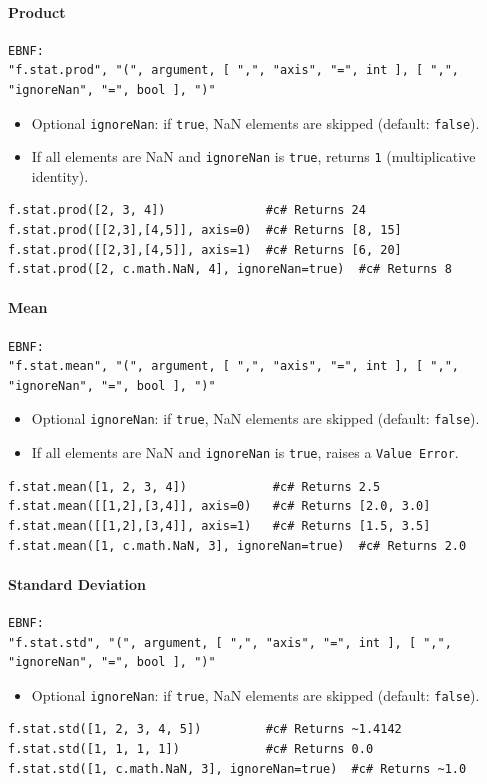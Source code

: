 \paragraph{Product}
\begin{verbatim}
EBNF:
"f.stat.prod", "(", argument, [ ",", "axis", "=", int ], [ ",", "ignoreNan", "=", bool ], ")"
\end{verbatim}
\begin{itemize}
\item Optional \texttt{ignoreNan}: if \texttt{true}, NaN elements are skipped (default: \texttt{false}).
\item If all elements are NaN and \texttt{ignoreNan} is \texttt{true}, returns \texttt{1} (multiplicative identity).
\end{itemize}
\begin{verbatim}
f.stat.prod([2, 3, 4])              #c# Returns 24
f.stat.prod([[2,3],[4,5]], axis=0)  #c# Returns [8, 15]
f.stat.prod([[2,3],[4,5]], axis=1)  #c# Returns [6, 20]
f.stat.prod([2, c.math.NaN, 4], ignoreNan=true)  #c# Returns 8
\end{verbatim}

\paragraph{Mean}
\begin{verbatim}
EBNF:
"f.stat.mean", "(", argument, [ ",", "axis", "=", int ], [ ",", "ignoreNan", "=", bool ], ")"
\end{verbatim}
\begin{itemize}
\item Optional \texttt{ignoreNan}: if \texttt{true}, NaN elements are skipped (default: \texttt{false}).
\item If all elements are NaN and \texttt{ignoreNan} is \texttt{true}, raises a \texttt{Value Error}.
\end{itemize}
\begin{verbatim}
f.stat.mean([1, 2, 3, 4])            #c# Returns 2.5
f.stat.mean([[1,2],[3,4]], axis=0)   #c# Returns [2.0, 3.0]
f.stat.mean([[1,2],[3,4]], axis=1)   #c# Returns [1.5, 3.5]
f.stat.mean([1, c.math.NaN, 3], ignoreNan=true)  #c# Returns 2.0
\end{verbatim}

\paragraph{Standard Deviation}
\begin{verbatim}
EBNF:
"f.stat.std", "(", argument, [ ",", "axis", "=", int ], [ ",", "ignoreNan", "=", bool ], ")"
\end{verbatim}
\begin{itemize}
\item Optional \texttt{ignoreNan}: if \texttt{true}, NaN elements are skipped (default: \texttt{false}).
\end{itemize}
\begin{verbatim}
f.stat.std([1, 2, 3, 4, 5])         #c# Returns ~1.4142
f.stat.std([1, 1, 1, 1])            #c# Returns 0.0
f.stat.std([1, c.math.NaN, 3], ignoreNan=true)  #c# Returns ~1.0
\end{verbatim}

